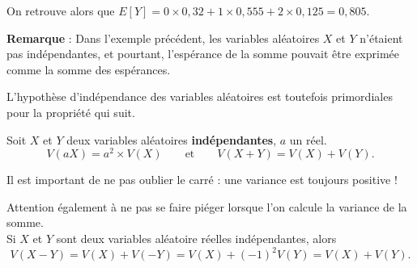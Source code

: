 \documentclass[11pt,fleqn, openany]{book} %
\begin{document}
\begin{example}
On retrouve alors que $E[Y] = 0 \times 0,32 + 1 \times 0,555 + 2 \times 0,125 = 0,805$.
\end{example}

\textbf{Remarque} : Dans l'exemple précédent, les variables aléatoires $X$ et $Y$ n'étaient pas indépendantes, et pourtant, l'espérance de la somme pouvait être exprimée comme la somme des espérances.

L'hypothèse d'indépendance des variables aléatoires est toutefois primordiales pour la propriété qui suit.

\begin{proposition}Soit $X$ et $Y$ deux variables aléatoires \textbf{indépendantes}, $a$ un réel.
\[V(aX)=a^2\times V(X) \qquad\text{et}\qquad  V(X+Y)=V(X)+V(Y).\]\vspace{-0,5cm}
\end{proposition}

Il est important de ne pas oublier le carré : une variance est toujours positive ! 

Attention également à ne pas se faire piéger lorsque l'on calcule la variance de la somme. \\
Si $X$ et $Y$ sont deux variables aléatoire réelles indépendantes, alors \[V(X-Y)=V(X)+V(-Y)=V(X)+(-1)^2V(Y)=V(X)+V(Y).\]
\end{document}

